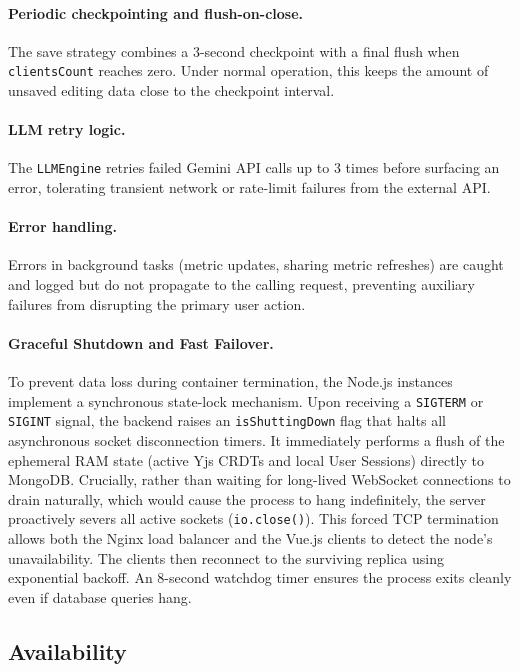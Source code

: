 \documentclass{scrartcl}
\begin{document}
  \paragraph{Periodic checkpointing and flush-on-close.}
  The save strategy combines a 3-second checkpoint with a final flush when
  \texttt{clientsCount} reaches zero. Under normal operation, this keeps the amount of
  unsaved editing data close to the checkpoint interval.

  \paragraph{LLM retry logic.}
  The \texttt{LLMEngine} retries failed Gemini API calls up to 3 times before surfacing an
  error, tolerating transient network or rate-limit failures from the external API.

  \paragraph{Error handling.}
  Errors in background tasks (metric updates, sharing metric refreshes) are caught and logged
  but do not propagate to the calling request, preventing auxiliary failures from disrupting
  the primary user action.

  \paragraph{Graceful Shutdown and Fast Failover.}
  To prevent data loss during container termination, the Node.js instances implement a synchronous state-lock mechanism.
  Upon receiving a \texttt{SIGTERM} or \texttt{SIGINT} signal, the backend raises an \texttt{isShuttingDown} flag that halts all asynchronous
  socket disconnection timers.
  It immediately performs a flush of the ephemeral RAM state (active Yjs CRDTs and local User Sessions) directly to MongoDB.
  Crucially, rather than waiting for long-lived WebSocket connections to drain naturally, which would cause
  the process to hang indefinitely, the server proactively severs all active sockets (\texttt{io.close()}).
  This forced TCP termination allows both the Nginx load balancer and the Vue.js clients to detect the node's
  unavailability. The clients then reconnect to the surviving replica using exponential backoff.
  An 8-second watchdog timer ensures the process exits cleanly even if database queries hang.

  \subsection{Availability}\label{availability}
\end{document}
